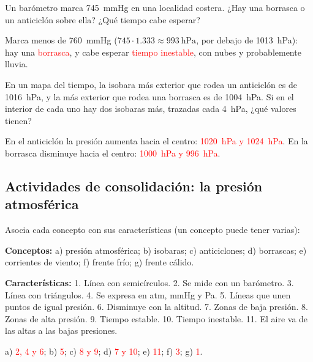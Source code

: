 \begin{exercise}
    Un barómetro marca \qty{745}{\mmHg} en una localidad costera. ¿Hay una borrasca o un anticiclón sobre ella? ¿Qué tiempo cabe esperar?
    \begin{solu}
        Marca menos de \qty{760}{\mmHg} (\(745 \cdot \num{1.333} \approx \qty{993}{\hecto\pascal}\), por debajo de \qty{1013}{\hecto\pascal}): hay una \textcolor{red}{borrasca}, y cabe esperar \textcolor{red}{tiempo inestable}, con nubes y probablemente lluvia.
    \end{solu}
\end{exercise}

\begin{exercise}
    En un mapa del tiempo, la isobara más exterior que rodea un anticiclón es de \qty{1016}{\hecto\pascal}, y la más exterior que rodea una borrasca es de \qty{1004}{\hecto\pascal}. Si en el interior de cada uno hay dos isobaras más, trazadas cada \qty{4}{\hecto\pascal}, ¿qué valores tienen?
    \begin{solu}
        En el anticiclón la presión aumenta hacia el centro: \textcolor{red}{\qty{1020}{\hecto\pascal} y \qty{1024}{\hecto\pascal}}. En la borrasca disminuye hacia el centro: \textcolor{red}{\qty{1000}{\hecto\pascal} y \qty{996}{\hecto\pascal}}.
    \end{solu}
\end{exercise}

\subsection*{Actividades de consolidación: la presión atmosférica}

\begin{exercise}
    Asocia cada concepto con sus características (un concepto puede tener varias):

    \textbf{Conceptos:} a) presión atmosférica; b) isobaras; c) anticiclones; d) borrascas; e) corrientes de viento; f) frente frío; g) frente cálido.

    \textbf{Características:} 1. Línea con semicírculos. 2. Se mide con un barómetro. 3. Línea con triángulos. 4. Se expresa en atm, mmHg y Pa. 5. Líneas que unen puntos de igual presión. 6. Disminuye con la altitud. 7. Zonas de baja presión. 8. Zonas de alta presión. 9. Tiempo estable. 10. Tiempo inestable. 11. El aire va de las altas a las bajas presiones.
    \begin{solu}
        a) \textcolor{red}{2, 4 y 6}; b) \textcolor{red}{5}; c) \textcolor{red}{8 y 9}; d) \textcolor{red}{7 y 10}; e) \textcolor{red}{11}; f) \textcolor{red}{3}; g) \textcolor{red}{1}.
    \end{solu}
\end{exercise}


